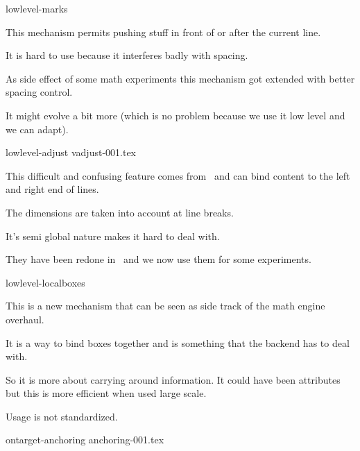 \stopitemize

\blank[3*big]

\starttyping
lowlevel-marks
\stoptyping

\stoptitle

\starttitle[title=Vadjust]

\startitemize

\startitem
    This mechanism permits pushing stuff in front of or after the current
    line.
\stopitem

\startitem
    It is hard to use because it interferes badly with spacing.
\stopitem

\startitem
    As side effect of some math experiments this mechanism got extended
    with better spacing control.
\stopitem

\startitem
    It might evolve a bit more (which is no problem because we use it low level
    and we can adapt).
\stopitem

\stopitemize

\blank[3*big]

\starttyping
lowlevel-adjust %
vadjust-001.tex
\stoptyping

\stoptitle

\starttitle[title=Local boxes]

\startitemize

\startitem
    This difficult and confusing feature comes from \ALEPH\ and can bind
    content to the left and right end of lines.
\stopitem

\startitem
    The dimensions are taken into account at line breaks.
\stopitem

\startitem
    It's semi global nature makes it hard to deal with.
\stopitem

\startitem
    They have been redone in \LUAMETATEX\ and we now use them for some
    experiments.
\stopitem

\stopitemize

\blank[3*big]

\starttyping
lowlevel-localboxes
\stoptyping

\stoptitle

\starttitle[title=Anchors]

\startitemize

\startitem
    This is a new mechanism that can be seen as side track of the math
    engine overhaul.
\stopitem

\startitem
    It is a way to bind boxes together and is something that the backend
    has to deal with.
\stopitem

\startitem
    So it is more about carrying around information. It could have been
    attributes but this is more efficient when used large scale.
\stopitem

\startitem
    Usage is not standardized.
\stopitem

\stopitemize

\blank[3*big]

\starttyping
ontarget-anchoring
anchoring-001.tex
\stoptyping

\stoptitle



\stopdocument
